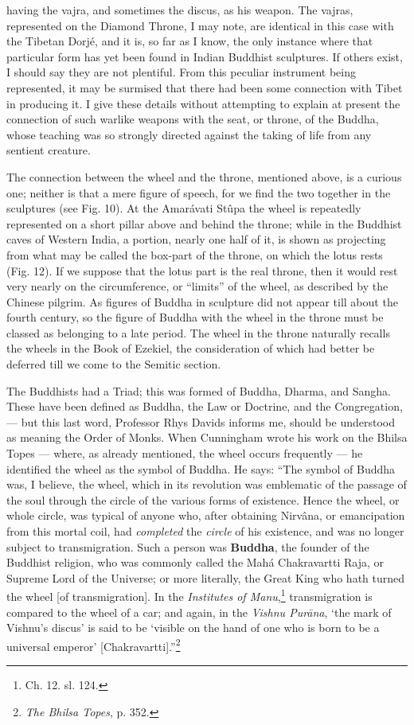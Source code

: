 \documentclass[a4paper, 11pt, oneside, polutonikogreek, english]{article}
\begin{document}
having the vajra, and sometimes the discus, as his weapon. The vajras, represented on the Diamond Throne, I may note, are identical in this case with the Tibetan Dorjé, and it is, so far as I know, the only instance where that particular form has yet been found in Indian Buddhist sculptures. If others exist, I should say they are not plentiful. From this peculiar instrument being represented, it may be surmised that there had been some connection with Tibet in producing it. I give these details without attempting to explain at present the connection of such warlike weapons with the seat, or throne, of the Buddha, whose teaching was so strongly directed against the taking of life from any sentient creature.

The connection between the wheel and the throne, mentioned above, is a curious one; neither is that a mere figure of speech, for we find the two together in the sculptures (see Fig. 10). At the Amarávati Stûpa the wheel is repeatedly represented on a short pillar above and behind the throne; while in the Buddhist caves of Western India, a portion, nearly one half of it, is shown as projecting from what may be called the box-part of the throne, on which the lotus rests (Fig. 12). If we suppose that the lotus part is the real throne, then it would rest very nearly on the circumference, or ``limits'' of the wheel, as described by the Chinese pilgrim. As figures of Buddha in sculpture did not appear till about the fourth century, so the figure of Buddha with the wheel in the throne must be classed as belonging to a late period. The wheel in the throne naturally recalls the wheels in the Book of Ezekiel, the consideration of which had better be deferred till we come to the Semitic section.

The Buddhists had a Triad; this was formed of Buddha, Dharma, and Sangha. These have been defined as Buddha, the Law or Doctrine, and the Congregation, --- but this last word, Professor Rhys Davids informs me, should be understood as meaning the Order of Monks. When Cunningham wrote his work on the Bhilsa Topes --- where, as already mentioned, the wheel occurs frequently --- he identified the wheel as the symbol of Buddha. He says: ``The symbol of Buddha was, I believe, the wheel, which in its revolution was emblematic of the passage of the soul through the circle of the various forms of existence. Hence the wheel, or whole circle, was typical of anyone who, after obtaining Nirvâna, or emancipation from this mortal coil, had \emph{completed} the \emph{circle} of his existence, and was no longer subject to transmigration. Such a person was \textbf{Buddha}, the founder of the Buddhist religion, who was commonly called the Mahá Chakravartti Raja, or Supreme Lord of the Universe; or more literally, the Great King who hath turned the wheel [of transmigration]. In the \emph{Institutes of Manu},\footnote{Ch. 12. sl. 124.} transmigration is compared to the wheel of a car; and again, in the \emph{Vishnu Purāna}, `the mark of Vishnu's discus' is said to be `visible on the hand of one who is born to be a universal emperor' [Chakravartti].''\footnote{\emph{The Bhilsa Topes}, p. 352.}
\end{document}

